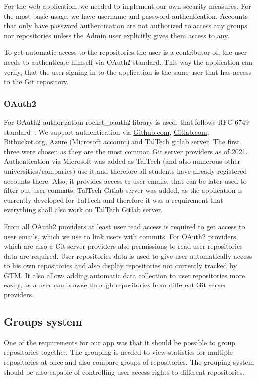 For the web application, we needed to implement our own security measures.
For the most basic usage, we have username and password authentication.
Accounts that only have password authentication are not authorized to access any groups nor repositories unless the Admin user
explicitly gives them access to any.

To get automatic access to the repositories the user is a contributor of, the user needs to authenticate himself via OAuth2 standard.
This way the application can verify, that the user signing in to the application is the same user that has access to the Git repository.

\subsubsection{OAuth2}\label{subsubsec:oauth2}
For OAuth2 authorization rocket{\_}oauth2 library is used, that follows RFC-6749 standard~\cite{rocket-oauth2, oauth2}.
We support authentication via \href{https://github.com/}{Github.com}, \href{https://about.gitlab.com/}{Gitlab.com},
\href{https://bitbucket.org/}{Bitbucket.org}, \href{https://azure.microsoft.com/}{Azure} (Microsoft account) and
TalTech \href{https://gitlab.cs.ttu.ee/}{gitlab server}.
The first three were chosen as they are the most common Git server providers as of 2021.
Authentication via Microsoft was added as TalTech (and also numerous other universities/companies) use it and therefore
all students have already registered accounts there.
Also, it provides access to user emails, that can be later used to filter out user commits.
TalTech Gitlab server was added, as the application is currently developed for TalTech and therefore it was a requirement
that everything shall also work on TalTech Gitlab server.

From all OAuth2 providers at least user read access is required to get access to user emails, which we use to link users with commits.
For OAuth2 providers, which are also a Git server providers also permissions to read user repositories data are required.
User repositories data is used to give user automatically access to his own repositories and also display repositories
not currently tracked by GTM.
It also allows adding automatic data collection to user repositories more easily, as a user can browse through
repositories from different Git server providers.

\subsection{Groups system}\label{subsec:group-system}
One of the requirements for our app was that it should be possible to group repositories together.
The grouping is needed to view statistics for multiple repositories at once and also compare groups of repositories.
The grouping system should be also capable of controlling user access rights to different repositories.

